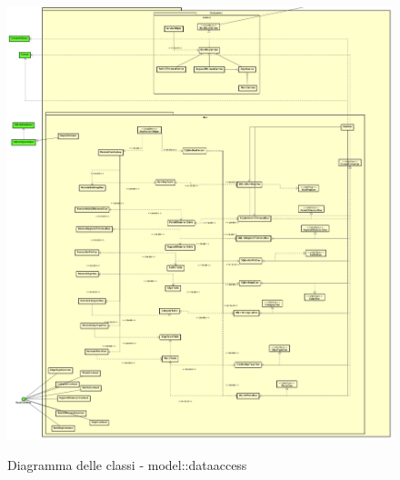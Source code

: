 \documentclass[../DefinizioneDiProdotto.tex,lanscape]{subfiles}
\begin{document}
\begin{figure}[H]
	\includegraphics[width=\textwidth]{diagrams/ModelCompleteNoMethods/PNGpackage/dataaccess}
	\label{dataaccessPackage}
	\caption{Diagramma delle classi - model::dataaccess}
\end{figure}
\end{document}
